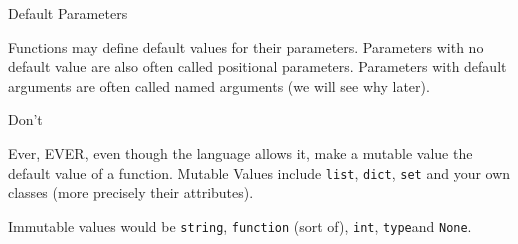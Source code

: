 \begin{frame}[fragile]{Default Parameters}

Functions may define default values for their parameters. Parameters
with no default value are also often called positional parameters.
Parameters with default arguments are often called named arguments (we
will see why later).

\begin{Shaded}
\begin{Highlighting}[]
 \OperatorTok{=}\NormalTok{):}
     

\NormalTok{)  }
\NormalTok{, }\NormalTok{)  }
\end{Highlighting}
\end{Shaded}

\end{frame}

\begin{frame}[fragile]

\begin{block}{Don't}

Ever, EVER, even though the language allows it, make a mutable value the
default value of a function. Mutable Values include \texttt{list},
\texttt{dict}, \texttt{set} and your own classes (more precisely their
attributes).

Immutable values would be \texttt{string}, \texttt{function} (sort of),
\texttt{int}, \texttt{type}and \texttt{None}.

\begin{Shaded}
\begin{Highlighting}[]
 \OperatorTok{=}\NormalTok{[]):}
\end{Highlighting}
\end{Shaded}

\end{block}

\end{frame}


